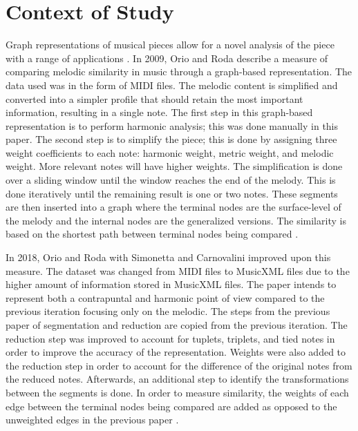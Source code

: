
\section{Context of Study}

Graph representations of musical pieces allow for a novel analysis of the piece with a range of applications \cite{OrioRoda, ClarkCook, HernandezOlivanBeltran}. In 2009, Orio and Roda describe a measure of comparing melodic similarity in music through a graph-based representation. The data used was in the form of MIDI files. The melodic content is simplified and converted into a simpler profile that should retain the most important information, resulting in a single note. The first step in  this graph-based representation is to perform harmonic analysis; this was done manually in this paper. The second step is to simplify the piece; this is done by assigning three weight coefficients to each note: harmonic weight, metric weight, and melodic weight. More relevant notes will have higher weights. The simplification is done over a sliding window until the window reaches the end of the melody. This is done iteratively until the remaining result is one or two notes. These segments are then inserted into a graph where the terminal nodes are the surface-level of the melody and the internal nodes are the generalized versions. The similarity is based on the shortest path between terminal nodes being compared \cite{OrioRoda}.

In 2018, Orio and Roda with Simonetta and Carnovalini improved upon this measure. The dataset was changed from MIDI files to MusicXML files due to the higher amount of information stored in MusicXML files. The paper intends to represent both a contrapuntal and harmonic point of view compared to the previous iteration focusing only on the melodic. The steps from the previous paper of segmentation and reduction are copied from the previous iteration. The reduction step was improved to account for tuplets, triplets, and tied notes in order to improve the accuracy of the representation. Weights were also added to the reduction step in order to account for the difference of the original notes from the reduced notes. Afterwards, an additional step to identify the transformations between the segments is done. In order to measure similarity, the weights of each edge between the terminal nodes being compared are added as opposed to the unweighted edges in the previous paper \cite{SimonettaEtAl}.

